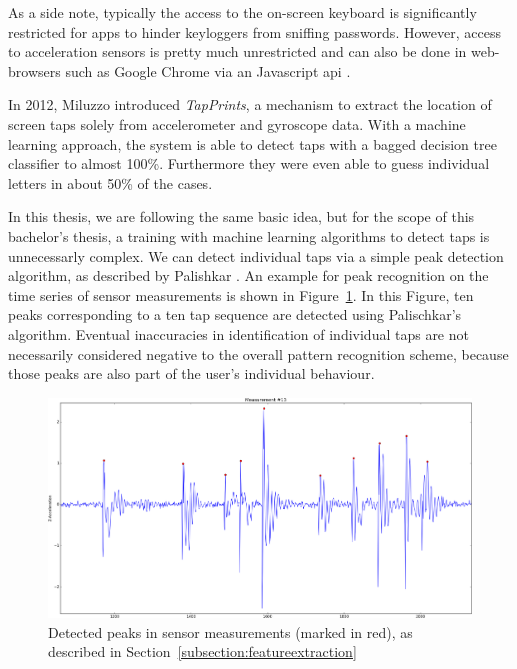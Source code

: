 As a side note, typically the access to the on-screen keyboard is significantly restricted for \glspl{app} to hinder keyloggers from sniffing passwords. However, access to acceleration sensors is pretty much unrestricted and can also be done in web-browsers such as Google Chrome via an Javascript \gls{api} \cite{devicemotionjavascript}.

In 2012, Miluzzo \etal\cite{miluzzo2012tapprints} introduced \emph{TapPrints}, a mechanism to extract the location of screen taps solely from accelerometer and gyroscope data. With a machine learning approach, the system is able to detect taps with a bagged decision tree classifier to almost 100\%. Furthermore they were even able to guess individual letters in about 50\% of the cases.

In this thesis, we are following the same basic idea, but for the scope of this bachelor's thesis, a training with machine learning algorithms to detect taps is unnecessarly complex. We can detect individual taps via a simple peak detection algorithm, as described by Palishkar \etal\cite{palshikar2009simple}. An example for peak recognition on the time series of sensor measurements is shown in Figure~\ref{fig:peakdetection}. In this Figure, ten peaks corresponding to a ten tap sequence are detected using Palischkar's algorithm. Eventual inaccuracies in identification of individual taps are not necessarily considered negative to the overall pattern recognition scheme, because those peaks are also part of the user's individual behaviour.

\begin{figure}
    \centering
    \includegraphics[width=\linewidth]{figures/detectedPeaks.png}
    \caption{Detected peaks in sensor measurements (marked in red), as described in Section~\ref{subsection:featureextraction}}
    \label{fig:peakdetection}
\end{figure}

